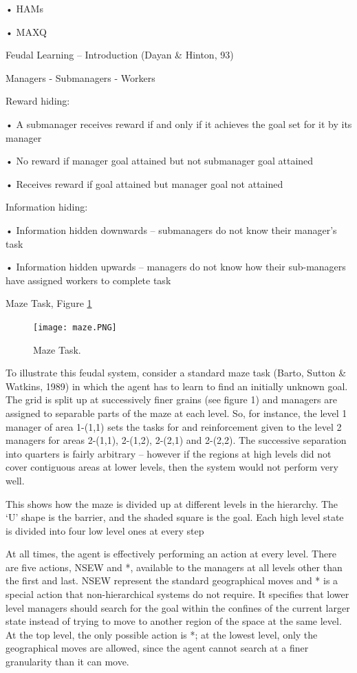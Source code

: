 \documentclass[english]{article}
\begin{document}
• HAMs

• MAXQ

\item Feudal Learning – Introduction   (Dayan \& Hinton, 93)

Managers - Submanagers - Workers

\benum 
\item  
Reward hiding: 

•  A submanager receives reward
if and only if it achieves the
goal set for it by its manager

• No reward if manager goal
attained but not submanager
goal attained

• Receives reward if goal
attained but manager goal not
attained

\item  
Information hiding: 

• Information hidden
downwards – submanagers do
not know their manager's task

• Information hidden upwards –
managers do not know how
their sub-managers have
assigned workers to complete
task

\item  Maze Task, Figure \ref{maze10}

  \begin{figure}
        \centering
        \texttt{[image: maze.PNG]}
        
        \caption{Maze Task.}
        \label{maze10}
    \end{figure}


To illustrate this feudal system, consider a standard maze task (Barto, Sutton \&
Watkins, 1989) in which the agent has to learn to find an initially unknown goal.
The grid is split up at successively finer grains (see figure 1) and managers are
assigned to separable parts of the maze at each level. So, for instance, the level 1
manager of area 1-(1,1) sets the tasks for and reinforcement given to the level 2
managers for areas 2-(1,1), 2-(1,2), 2-(2,1) and 2-(2,2). The successive separation
into quarters is fairly arbitrary – however if the regions at high levels did not cover
contiguous areas at lower levels, then the system would not perform very well.



This shows how the maze is divided up at
different levels in the hierarchy. The ‘U' shape is the barrier, and the shaded square
is the goal. Each high level state is divided into four low level ones at every step

At all times, the agent is effectively performing an action at every level. There are five actions, NSEW and *, available to the managers at all levels other than the
first and last. NSEW represent the standard geographical moves and * is a special
action that non-hierarchical systems do not require. It specifies that lower level
managers should search for the goal within the confines of the current larger state
instead of trying to move to another region of the space at the same level. At the
top level, the only possible action is *; at the lowest level, only the geographical
moves are allowed, since the agent cannot search at a finer granularity than it can
move.
\end{document}
